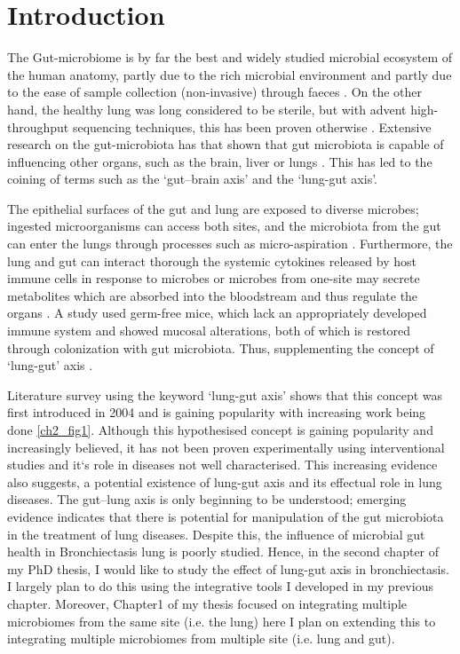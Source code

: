 \section{Introduction}

The Gut-microbiome is by far the best and widely studied microbial ecosystem of the human anatomy, partly due to the rich microbial environment and partly due to the ease of sample collection (non-invasive) through faeces \cite{Budden2017}. On the other hand, the healthy lung was long considered to be sterile, but with advent high-throughput sequencing techniques, this has been proven otherwise \cite{Barker2002}. Extensive research on the gut-microbiota has that shown that gut microbiota is capable of influencing other organs, such as the brain, liver or lungs \cite{Bell2019}. This has led to the coining of terms such as the `gut–brain axis' and the `lung-gut axis'. 

The epithelial surfaces of the gut and lung are exposed to diverse microbes; ingested microorganisms can access both sites, and the microbiota from the gut can enter the lungs through processes such as micro-aspiration \cite{Budden2017}. Furthermore, the lung and gut can interact thorough the systemic cytokines released by host immune cells in response to microbes or microbes from one-site may secrete metabolites which are absorbed into the bloodstream and thus regulate the organs \cite{Dang2019}. A study used germ-free mice, which lack an appropriately developed immune system and showed mucosal alterations, both of which is restored through colonization with gut microbiota. Thus, supplementing the concept of `lung-gut' axis \cite{Budden2017}. 

Literature survey using the keyword `lung-gut axis' shows that this concept was first introduced in 2004 and is gaining popularity with increasing work being done \ref{ch2_fig1}. Although this hypothesised concept is gaining popularity and increasingly believed, it has not been proven experimentally using interventional studies and it`s role in diseases not well characterised. This increasing evidence also suggests, a potential existence of lung-gut axis and its effectual role in lung diseases. The gut–lung axis is only beginning to be understood; emerging evidence indicates that there is potential for manipulation of the gut microbiota in the treatment of lung diseases. Despite this, the influence of microbial gut health in Bronchiectasis lung is poorly studied. Hence, in the second chapter of my PhD thesis, I would like to study the effect of lung-gut axis in bronchiectasis. I largely plan to do this using the integrative tools I developed in my previous chapter. Moreover, Chapter1 of my thesis focused on integrating multiple microbiomes from the same site (i.e. the lung) here I plan on extending this to integrating multiple microbiomes from multiple site (i.e. lung and gut). 

